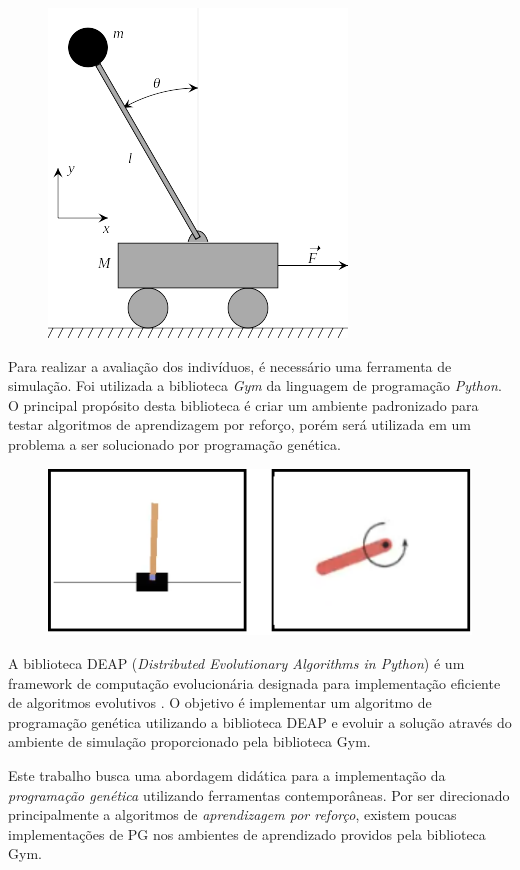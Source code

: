 \begin{figure}[!h]
\centering
\includegraphics[width=0.4\linewidth]{01_introducao/pend_inv.png}
\label{fig:intro-pendinv}
\end{figure}

Para realizar a avaliação dos indivíduos, é necessário uma ferramenta de simulação. Foi utilizada a biblioteca \textit{Gym} \cite{openaigym} da linguagem de programação \textit{Python}. O principal propósito desta biblioteca é criar um ambiente padronizado para testar algoritmos de aprendizagem por reforço, porém será utilizada em um problema a ser solucionado por programação genética.

\begin{figure}[H]
\centering
\includegraphics[width=0.5\linewidth]{01_introducao/gym_ex.pdf}
\label{fig:intro-gymexemplo}
\end{figure}

A biblioteca DEAP (\textit{Distributed Evolutionary Algorithms in Python}) é um framework de computação evolucionária designada para implementação eficiente de algoritmos evolutivos \cite{deap}. O objetivo é implementar um algoritmo de programação genética utilizando a biblioteca DEAP e evoluir a solução através do ambiente de simulação proporcionado pela biblioteca Gym.

Este trabalho busca uma abordagem didática para a implementação da \textit{programação genética} utilizando ferramentas contemporâneas. Por ser direcionado principalmente a algoritmos de \textit{aprendizagem por reforço}, existem poucas implementações de PG nos ambientes de aprendizado providos pela biblioteca Gym.

